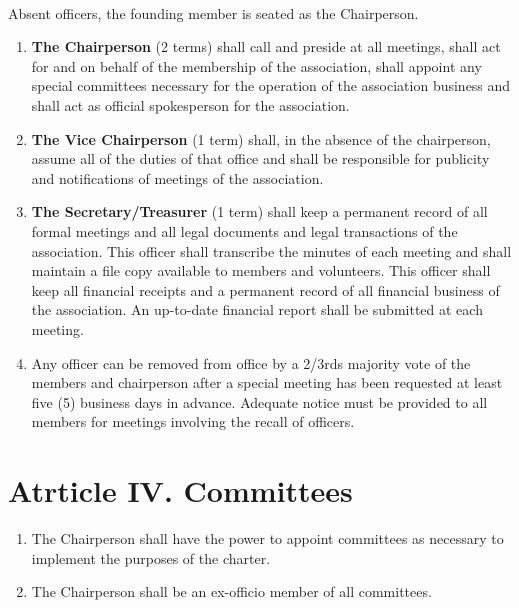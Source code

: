 \documentclass[letterpaper,10pt]{article}
\begin{document}
\paragraph{} Absent officers, the founding member is seated as the Chairperson.

\begin{enumerate}[label=(\Alph*)]

\item \textbf{The Chairperson} (2 terms) shall call and preside at all meetings, shall act for and on behalf of the membership of the association, shall appoint any special committees necessary for the operation of the association business and shall act as official spokesperson for the association.

\item \textbf{The Vice Chairperson} (1 term) shall, in the absence of the chairperson,
assume all of the duties of that office and shall be responsible for publicity and notifications of meetings of the association.

\item \textbf{The Secretary/Treasurer} (1 term) shall keep a permanent record of all formal meetings and all legal documents and legal transactions of the association. This officer shall transcribe the minutes of each meeting and shall maintain a file copy available to members and volunteers. This officer shall keep all financial receipts and a permanent record of all financial business of the association. An up-to-date financial report shall be submitted at each meeting. 

\item Any officer can be removed from office by a 2/3rds majority vote of the members and chairperson after a special meeting has been requested at least five (5) business days in advance. Adequate notice must be provided to all members for meetings involving the recall of officers.

\end{enumerate}
\section*{Atrticle IV. Committees}
\begin{enumerate}[label=(\Alph*)]
\item The Chairperson shall have the power to appoint committees as necessary to implement the purposes of the charter.
\item The Chairperson shall be an ex-officio member of all committees.
\end{enumerate}
\end{document}
